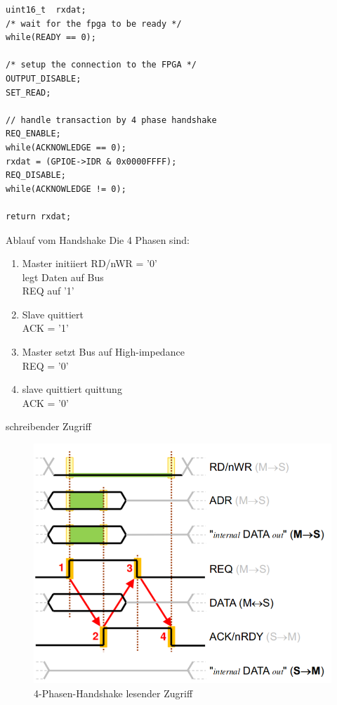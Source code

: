 \documentclass[aspectratio=169,presentation]{beamer}
\begin{document}
\begin{frame} [fragile]
  \begin{lstlisting}
uint16_t  rxdat;
/* wait for the fpga to be ready */
while(READY == 0);

/* setup the connection to the FPGA */
OUTPUT_DISABLE;
SET_READ;

// handle transaction by 4 phase handshake
REQ_ENABLE;
while(ACKNOWLEDGE == 0);
rxdat = (GPIOE->IDR & 0x0000FFFF);
REQ_DISABLE;
while(ACKNOWLEDGE != 0);

return rxdat;
  \end{lstlisting}
\end{frame}


\begin{frame} {Ablauf vom Handshake}
  Die 4 Phasen sind:
  \begin{enumerate}
    \setlength\itemsep{.5cm}
    \item Master initiiert RD/nWR = '0'\\
          legt Daten auf Bus \\
          REQ auf '1'
    \item Slave quittiert\\
          ACK = '1'
    \item Master setzt Bus auf High-impedance\\
          REQ = '0'
    \item slave quittiert quittung\\
          ACK = '0'
  \end{enumerate}
\end{frame}


\begin{frame} {schreibender Zugriff}
  \begin{figure}[ht]
    \centering
    \includegraphics[height=0.7\textheight]{figs/schreibender_zugriff.png}
    \caption{4-Phasen-Handshake lesender Zugriff}
  \end{figure}
\end{frame}
\end{document}
